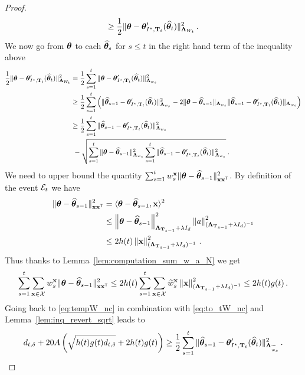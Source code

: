 \begin{proof}
\begin{equation}
  \geq  \frac{1}{2} \Vert {\boldsymbol \theta} - {\boldsymbol \theta}'_{I^\star,{\bf T}_t}(\widehat{{\boldsymbol \theta}}_t) \Vert_{{\boldsymbol \Lambda}_{W_t}}^2\,.
\end{equation}
We now go from ${\boldsymbol \theta}$ to each $\widehat{{\boldsymbol \theta}}_s$ for $s \le t$ in the right hand term of the inequality above
\begin{align}
\frac{1}{2}\Vert {\boldsymbol \theta} - {\boldsymbol \theta}'_{I^\star,{\bf T}_t}(\widehat{{\boldsymbol \theta}}_t) \Vert_{{\boldsymbol \Lambda}_{W_t}}^2
&=   \frac{1}{2} \sum_{s=1}^t  \Vert {\boldsymbol \theta} - {\boldsymbol \theta}'_{I^\star,{\bf T}_t}(\widehat{{\boldsymbol \theta}}_t) \Vert_{{\boldsymbol \Lambda}_{w_s}}^2
\nonumber\\
&\ge \frac{1}{2} \sum_{s=1}^t \left(\Vert \widehat{{\boldsymbol \theta}}_{s-1} - {\boldsymbol \theta}'_{I^\star,{\bf T}_t}(\widehat{{\boldsymbol \theta}}_t)\Vert_{{\boldsymbol \Lambda}_{w_s}}^2 - 2\Vert {\boldsymbol \theta} - \widehat{{\boldsymbol \theta}}_{s-1} \Vert_{{\boldsymbol \Lambda}_{w_s}} \Vert \widehat{{\boldsymbol \theta}}_{s-1} - {\boldsymbol \theta}'_{I^\star,{\bf T}_t}(\widehat{{\boldsymbol \theta}}_t) \Vert_{{\boldsymbol \Lambda}_{w_s}}\right)
\nonumber\\
&\ge \frac{1}{2} \sum_{s=1}^t \Vert \widehat{{\boldsymbol \theta}}_{s-1} - {\boldsymbol \theta}'_{I^\star,{\bf T}_t}(\widehat{{\boldsymbol \theta}}_t) \Vert_{{\boldsymbol \Lambda}_{w_s}}^2
\nonumber\\
&\ - \sqrt{\sum_{s=1}^t \Vert {\boldsymbol \theta} - \widehat{{\boldsymbol \theta}}_{s-1} \Vert_{{\boldsymbol \Lambda}_{w_s}}^2 \sum_{s=1}^t\Vert \widehat{{\boldsymbol \theta}}_{s-1} -{\boldsymbol \theta}'_{I^\star,{\bf T}_t}(\widehat{{\boldsymbol \theta}}_t) \Vert_{{\boldsymbol \Lambda}_{w_s}}^2}
\: .\label{eq:tempW_nc}
\end{align}
We need to upper bound the quantity $\sum_{s=1}^t  w_s^{{\bf x}}\Vert {\boldsymbol \theta} - \widehat{{\boldsymbol \theta}}_{s-1} \Vert_{{\bf x}{\bf x}^\mathsf{\scriptscriptstyle T}}^2$. By definition of the event $\mathcal{E}_t$ we have
\begin{align*}
  \Vert {\boldsymbol \theta} - \widehat{{\boldsymbol \theta}}_{s-1} \Vert_{{\bf x}{\bf x}^\mathsf{\scriptscriptstyle T}}^2 &=  \langle {\boldsymbol \theta} - \widehat{{\boldsymbol \theta}}_{s-1} ,{\bf x}\rangle^2\\
  &\leq\left\lVert {\boldsymbol \theta} - \widehat{{\boldsymbol \theta}}_{s-1}\right\rVert_{{\boldsymbol \Lambda}_{{\bf T}_{s-1}}+\lambda I_d}^2 \left\lVert a\right\rVert_{({\boldsymbol \Lambda}_{{\bf T}_{s-1}}+\lambda I_d)^{-1}}^2\\
  &\leq 2 h(t) \left\lVert{\bf x}\right\rVert_{({\boldsymbol \Lambda}_{{\bf T}_{s-1}}+\lambda I_d)^{-1}}^2\,.
\end{align*}
Thus thanks to Lemma~\ref{lem:computation_sum_w_a_N} we get
\begin{align*}
  \sum_{s=1}^t \sum_{{\bf x}\in\mathcal{X}} w_s^{{\bf x}}\Vert {\boldsymbol \theta} - \widehat{{\boldsymbol \theta}}_{s-1} \Vert_{{\bf x}{\bf x}^\mathsf{\scriptscriptstyle T}}^2 \leq 2h(t)\sum_{s=1}^t \sum_{{\bf x}\in\mathcal{X}} \widetilde{w}_s^{{\bf x}} \left\lVert {\bf x}\right\rVert_{({\boldsymbol \Lambda}_{{\bf T}_{s-1}}+\lambda I_d)^{-1}}^2 \leq 2h(t)g(t)\,.
\end{align*}
Going back to \eqref{eq:tempW_nc} in combination with \eqref{eq:to_tW_nc} and Lemma~\ref{lem:inq_revert_sqrt} leads to
\begin{align}
\label{eq:to_hteta_nc}
d_{t,\delta} + 20 A\left(\sqrt{h(t)g(t) d_{t,\delta}}+ 2h(t)g(t)\right)   \geq
\frac{1}{2}\sum_{s=1}^t \Vert \widehat{{\boldsymbol \theta}}_{s-1} - {\boldsymbol \theta}'_{I^\star,{\bf T}_t}(\widehat{{\boldsymbol \theta}}_t)\Vert_{{\boldsymbol \Lambda}_{\widetilde{w}_s}}^2\,.
\end{align}
\end{proof}



